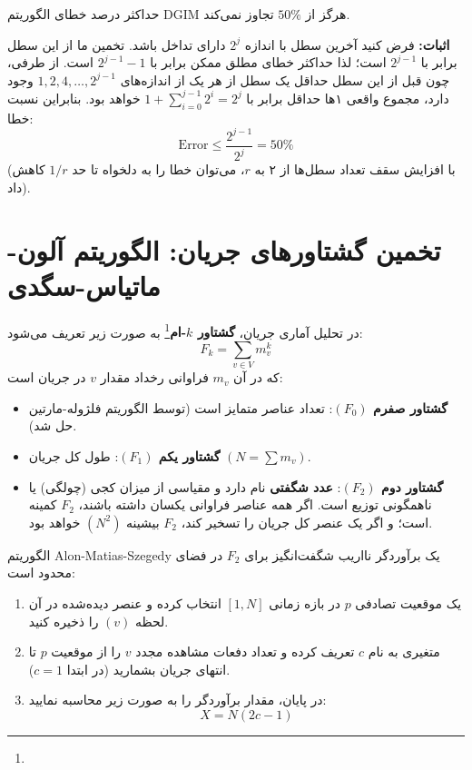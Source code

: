 \begin{theorem}
حداکثر درصد خطای الگوریتم DGIM هرگز از $50\%$ تجاوز نمی‌کند.
\end{theorem}
\textbf{اثبات:}
فرض کنید آخرین سطل با اندازه $2^j$ دارای تداخل باشد. تخمین ما از این سطل برابر با $2^{j-1}$ است؛ لذا حداکثر خطای مطلق ممکن برابر با $2^{j-1} - 1$ است. از طرفی، چون قبل از این سطل حداقل یک سطل از هر یک از اندازه‌های $1, 2, 4, \dots, 2^{j-1}$ وجود دارد، مجموع واقعی ۱ها حداقل برابر با $1 + \sum_{i=0}^{j-1} 2^i = 2^j$ خواهد بود. بنابراین نسبت خطا:
\begin{equation}
\text{Error} \le \frac{2^{j-1}}{2^j} = 50\%
\end{equation}
(با افزایش سقف تعداد سطل‌ها از ۲ به $r$، می‌توان خطا را به دلخواه تا حد $1/r$ کاهش داد).

\section{تخمین گشتاورهای جریان: الگوریتم آلون-ماتیاس-سگدی \texorpdfstring{}{(AMS)}}
در تحلیل آماری جریان، \textbf{گشتاور $k$-ام}\footnote{} به صورت زیر تعریف می‌شود:
\begin{equation}
F_k = \sum_{v \in V} m_v^k
\end{equation}
که در آن $m_v$ فراوانی رخداد مقدار $v$ در جریان است:
\begin{itemize}
    \item \textbf{گشتاور صفرم $(F_0)$}: تعداد عناصر متمایز است (توسط الگوریتم فلژوله-مارتین حل شد).
    \item \textbf{گشتاور یکم $(F_1)$}: طول کل جریان $(N = \sum m_v)$.
    \item \textbf{گشتاور دوم $(F_2)$}: \textbf{عدد شگفتی } نام دارد و مقیاسی از میزان کجی (چولگی) یا ناهمگونی توزیع است. اگر همه عناصر فراوانی یکسان داشته باشند، $F_2$ کمینه است؛ و اگر یک عنصر کل جریان را تسخیر کند، $F_2$ بیشینه $(N^2)$ خواهد بود.
\end{itemize}

\begin{algorithmbox}
الگوریتم Alon-Matias-Szegedy یک برآوردگر نااریب شگفت‌انگیز برای $F_2$ در فضای محدود است:
\begin{enumerate}
    \item یک موقعیت تصادفی $p$ در بازه زمانی $[1, N]$ انتخاب کرده و عنصر دیده‌شده در آن لحظه $(v)$ را ذخیره کنید.
    \item متغیری به نام $c$ تعریف کرده و تعداد دفعات مشاهده مجدد $v$ را از موقعیت $p$ تا انتهای جریان بشمارید (در ابتدا $c = 1$).
    \item در پایان، مقدار برآوردگر را به صورت زیر محاسبه نمایید:
    \begin{equation}
    X = N (2c - 1)
    \end{equation}
\end{enumerate}
\end{algorithmbox}

